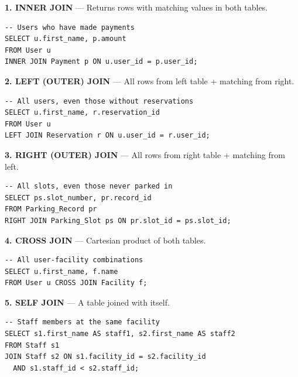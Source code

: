 \documentclass[12pt,a4paper]{article}
\begin{document}
\begin{questionbox}
\end{questionbox}
\begin{answerbox}

\textbf{1. INNER JOIN} --- Returns rows with matching values in both tables.
\begin{lstlisting}
-- Users who have made payments
SELECT u.first_name, p.amount
FROM User u
INNER JOIN Payment p ON u.user_id = p.user_id;
\end{lstlisting}

\textbf{2. LEFT (OUTER) JOIN} --- All rows from left table + matching from right.
\begin{lstlisting}
-- All users, even those without reservations
SELECT u.first_name, r.reservation_id
FROM User u
LEFT JOIN Reservation r ON u.user_id = r.user_id;
\end{lstlisting}

\textbf{3. RIGHT (OUTER) JOIN} --- All rows from right table + matching from left.
\begin{lstlisting}
-- All slots, even those never parked in
SELECT ps.slot_number, pr.record_id
FROM Parking_Record pr
RIGHT JOIN Parking_Slot ps ON pr.slot_id = ps.slot_id;
\end{lstlisting}

\textbf{4. CROSS JOIN} --- Cartesian product of both tables.
\begin{lstlisting}
-- All user-facility combinations
SELECT u.first_name, f.name
FROM User u CROSS JOIN Facility f;
\end{lstlisting}

\textbf{5. SELF JOIN} --- A table joined with itself.
\begin{lstlisting}
-- Staff members at the same facility
SELECT s1.first_name AS staff1, s2.first_name AS staff2
FROM Staff s1
JOIN Staff s2 ON s1.facility_id = s2.facility_id
  AND s1.staff_id < s2.staff_id;
\end{lstlisting}
\end{answerbox}
\end{document}
